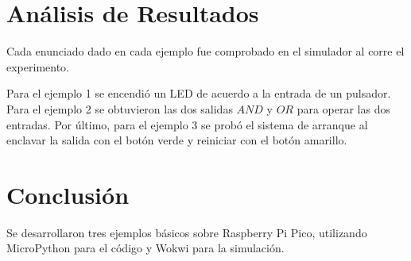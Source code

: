 \documentclass{article}
\begin{document}
    \section{Análisis de Resultados}\label{sec:análisis-de-resultados}


    Cada enunciado dado en cada ejemplo fue comprobado en el simulador al corre el experimento.

    \bigbreak

    Para el ejemplo 1 se encendió un LED de acuerdo a la entrada de un pulsador. Para el ejemplo 2 se obtuvieron las dos salidas $AND$ y $OR$ para operar las dos entradas. Por último, para el ejemplo 3 se probó el sistema de arranque al enclavar la salida con el botón verde y reiniciar con el botón amarillo.

    \section{Conclusión}\label{sec:conclusion}

    Se desarrollaron tres ejemplos básicos sobre Raspberry Pi Pico, utilizando MicroPython para el código y Wokwi para la simulación.

    \printbibliography
\end{document}
